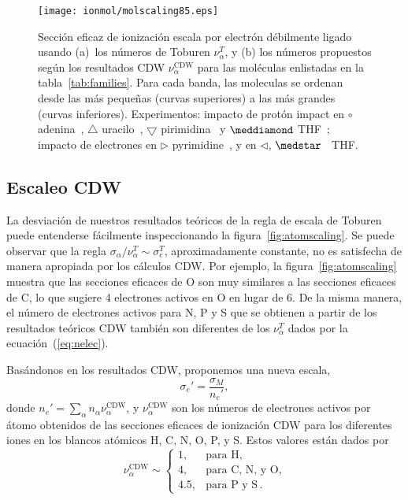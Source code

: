 \begin{figure*}[t!]
\centering
\texttt{[image: ionmol/molscaling85.eps]}
\caption[Sección eficaz de ionización por electrón débilmente ligado.]
{Sección eficaz de ionización escala por electrón débilmente ligado 
usando (a)~los números de Toburen $\nu_{\alpha}^T$, y (b) los
números propuestos según los resultados CDW $\nu_{\alpha}^{\text{CDW}}$ 
para las moléculas enlistadas en la tabla~\ref{tab:families}. 
Para cada banda, las moleculas se ordenan desde las más pequeñas (curvas
superiores) a las más grandes (curvas inferiores). Experimentos: 
impacto de protón impact en 
\mbox{\Large$\circ$} adenina~\cite{iriki2011}, 
$\triangle$ uracilo~\cite{itoh2013}, 
$\bigtriangledown$ pirimidina~\cite{wolff2014} y $\meddiamond$ 
THF~\cite{wang2016}; impacto de electrones en 
$\rhd$ pyrimidine~\cite{bug2017}, y en $\lhd$, 
$\medstar$~\cite{wolf2019,fuss2009} THF.}
\label{fig:newscaling}
\end{figure*}

\subsection{Escaleo CDW}
\label{subsec:CDW}

La desviación de nuestros resultados teóricos de la regla de escala de 
Toburen puede entenderse fácilmente inspeccionando la
figura~\ref{fig:atomscaling}. Se puede observar que la regla 
$\sigma_{\alpha}/\nu_{\alpha}^T\sim \sigma_{e}^T$, aproximadamente 
constante, no es satisfecha de manera apropiada por los cálculos CDW. 
Por ejemplo, la figura~\ref{fig:atomscaling} muestra que las secciones
eficaces de O son muy similares a las secciones eficaces de C, lo que 
sugiere 4 electrones activos en O en lugar de 6. De la misma manera, el 
número de electrones activos para N, P y S que se obtienen a partir de 
los resultados teóricos CDW también son diferentes de los $\nu_{\alpha}^T$ 
dados por la ecuación~(\ref{eq:nelec}).


Basándonos en los resultados CDW, proponemos una nueva escala,
\begin{equation}
\sigma_{e}'=\frac{\sigma_M}{n_e'},
\label{32} 
\end{equation}
donde $n_e'=\sum_{\alpha}n_{\alpha}\nu_{\alpha}^{\text{CDW}}$, y
$\nu_{\alpha}^{\text{CDW}}$ son los números de electrones activos 
por átomo obtenidos de las secciones eficaces de ionización CDW para los 
diferentes iones en los blancos atómicos H, C, N, O, P, y S. Estos 
valores están dados por
\begin{equation}
\nu_{\alpha }^{\text{CDW}} \sim\left\{ 
\begin{array}{ll}
1, & \text{para H,} \\
4, & \text{para C, N, y O,} \\ 
4.5, & \text{para P y S}\,.
\end{array}
\right. 
\label{eq:scalingCDW}
\end{equation}

